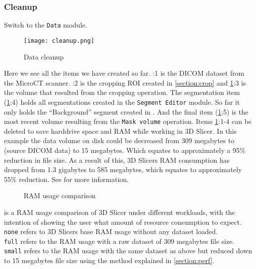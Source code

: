 \subsubsection{Cleanup}
Switch to the \texttt{Data} module.
\begin{figure}[h!]
	\centerline{
		\texttt{[image: cleanup.png]}}
	\caption{Data cleanup}\label{fig:clr}
\end{figure}
\noindent
Here we see all the items we have created so far.
:1 is the DICOM dataset from the MicroCT scanner.
:2 is the cropping ROI created in \cref{section:crop} and \cref{fig:clr}:3 is the volume that resulted from the cropping operation.
The segmentation item (\cref{fig:clr}:4) holds all segmentations created in the \texttt{Segment Editor} module. So far it only holds the ``Background'' segment created in . And the final item (\cref{fig:clr}:5) is the most recent volume resulting from the \texttt{Mask volume} operation.
Items \cref{fig:clr}:1-4 can be deleted to save harddrive space and RAM while working in 3D Slicer.
\noindent
In this example the data volume on disk could be decreased from 309 megabytes to (source DICOM data) to 15 megabytes.
Which equates to approximately a 95\% reduction in file size.
As a result of this, 3D Slicers RAM consumption has dropped from 1.3 gigabytes to 585 megabytes, which equates to approximately 55\% reduction.
See  for more information.
\newline
\begin{figure}
	\caption{RAM usage comparison}\label{fig:ramUC}
\end{figure}
\newline
\noindent
{} is a RAM usage comparison of 3D Slicer under different workloads, with the intention of showing the user what amount of resource consumption to expect.\\
\texttt{none} refers to 3D Slicers base RAM usage without any dataset loaded.\\
\texttt{full} refers to the RAM usage with a raw dataset of 309 megabytes file size.\\
\texttt{small} refers to the RAM usage with the same dataset as above but reduced down to 15 megabytes file size using the method explained in \cref{section:perf}.
\pagebreak


